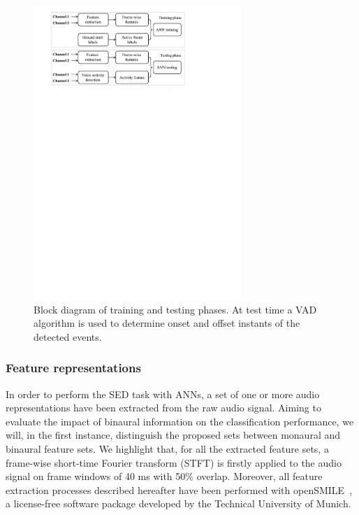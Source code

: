\begin{figure}[h]
	\centering
	\includegraphics[width=0.7\textwidth]{img/system_scheme.pdf}
	\caption[Sound Event Detection - DCASE 2016]{Block diagram of training and testing phases. At test time a VAD algorithm is used to determine onset and offset instants of the detected events.}
	\label{fig:system_scheme}
\end{figure}

\subsubsection{Feature representations}

In order to perform the SED task with ANNs, a set of one or more audio representations have been extracted from the raw audio signal. Aiming to evaluate the impact of binaural information on the classification performance, we will, in the first instance, distinguish the proposed sets between monaural and binaural feature sets. We highlight that, for all the extracted feature sets, a frame-wise short-time Fourier transform (STFT) is firstly applied to the audio signal on frame windows of 40 ms with 50\% overlap. Moreover, all feature extraction processes described hereafter have been performed with openSMILE~\cite{Eyben13-RDI}, a license-free software package developed by the Technical University of Munich.

